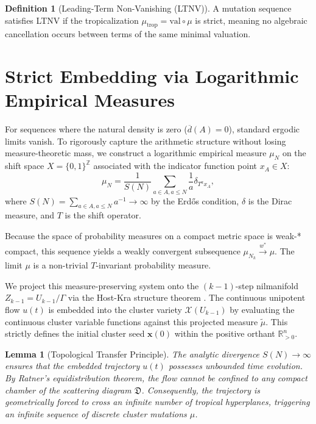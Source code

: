 \documentclass[11pt, a4paper, reqno]{amsart}
\newtheorem{lemma}[theorem]{Lemma}
\theoremstyle{definition}
\newtheorem{definition}[theorem]{Definition}
\newcommand{\R}{\mathbb{R}}
\newcommand{\Z}{\mathbb{Z}}
\newcommand{\mutrop}{\mu_{\mathrm{trop}}}
\newcommand{\val}{\mathrm{val}}
\begin{document}
\begin{definition}[Leading-Term Non-Vanishing (LTNV)]
A mutation sequence satisfies LTNV if the tropicalization $\mutrop = \val \circ \mu$ is strict, meaning no algebraic cancellation occurs between terms of the same minimal valuation.
\end{definition}

\section{Strict Embedding via Logarithmic Empirical Measures}
For sequences where the natural density is zero ($\overline{d}(A) = 0$), standard ergodic limits vanish. To rigorously capture the arithmetic structure without losing measure-theoretic mass, we construct a logarithmic empirical measure $\mu_N$ on the shift space $X = \{0,1\}^\Z$ associated with the indicator function point $x_A \in X$:
\begin{equation}
    \mu_N = \frac{1}{S(N)} \sum_{a \in A, a \le N} \frac{1}{a} \delta_{T^a x_A},
\end{equation}
where $S(N) = \sum_{a \in A, a \le N} a^{-1} \to \infty$ by the Erd\H{o}s condition, $\delta$ is the Dirac measure, and $T$ is the shift operator. 

Because the space of probability measures on a compact metric space is weak-* compact, this sequence yields a weakly convergent subsequence $\mu_{N_k} \xrightarrow{w^*} \mu$. The limit $\mu$ is a non-trivial $T$-invariant probability measure.

We project this measure-preserving system onto the $(k-1)$-step nilmanifold $Z_{k-1} = U_{k-1}/\Gamma$ via the Host-Kra structure theorem \cite{HostKra2005}. The continuous unipotent flow $u(t)$ is embedded into the cluster variety $\mathcal{X}(U_{k-1})$ by evaluating the continuous cluster variable functions against this projected measure $\tilde{\mu}$. This strictly defines the initial cluster seed $\mathbf{x}(0)$ within the positive orthant $\R_{>0}^n$.

\begin{lemma}[Topological Transfer Principle]
The analytic divergence $S(N) \to \infty$ ensures that the embedded trajectory $u(t)$ possesses unbounded time evolution. By Ratner's equidistribution theorem, the flow cannot be confined to any compact chamber of the scattering diagram $\mathfrak{D}$. Consequently, the trajectory is geometrically forced to cross an infinite number of tropical hyperplanes, triggering an infinite sequence of discrete cluster mutations $\mu$.
\end{lemma}
\end{document}
